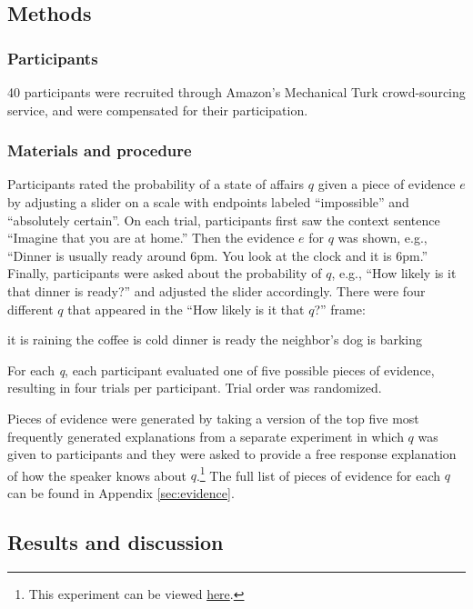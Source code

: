 \documentclass[11pt]{article}
\newcommand{\appref}[1]{Appendix \ref{#1}}
\begin{document}
\subsection{Methods}

\subsubsection{Participants}

40 participants were recruited through Amazon's Mechanical Turk crowd-sourcing service, and were compensated for their participation.

\subsubsection{Materials and procedure}

Participants rated the probability of a state of affairs $q$ given a piece of evidence $e$ by adjusting a slider on a scale with endpoints labeled ``impossible'' and ``absolutely certain''. On each trial, participants first saw the context sentence ``Imagine that you are at home.'' Then the evidence $e$ for $q$ was shown, e.g., ``Dinner is usually ready around 6pm. You look at the clock and it is 6pm.'' Finally, participants were asked about the probability of $q$, e.g., ``How likely is it that dinner is ready?'' and adjusted the slider accordingly. There were four different $q$ that appeared in the ``How likely is it that $q$?'' frame:

\begin{exe}
	\ex it is raining
	\ex the coffee is cold
	\ex dinner is ready
	\ex the neighbor's dog is barking
\end{exe}

For each \emph{q}, each participant evaluated one of five possible pieces of evidence, resulting in four trials per participant. Trial order was randomized. 

Pieces of evidence were generated by taking a version of the top five most frequently generated explanations from a separate experiment in which $q$ was given to participants and they were asked to provide a free response explanation of how the speaker knows about $q$.\footnote{This experiment can be viewed \href{http://stanford.edu/~jdegen/68_modals_freeproduction/modals.html}{here}.} The full list of pieces of evidence for each $q$ can be found in \appref{sec:evidence}.


\subsection{Results and discussion}
\end{document}
